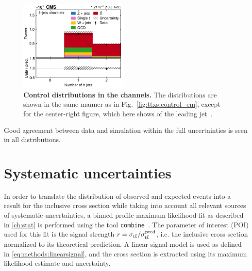 \begin{figure}[!hp]
\hfill
\includegraphics[width=0.49\textwidth]{figures/ttxs/nbtag_lj.pdf}
\caption{
   \textbf{Control distributions in the \ljets channels.} The distributions are shown in the same manner as in Fig.~\ref{fig:ttxs:control_em}, except for the center-right figure, which here shows \abseta of the leading jet~\cite{CMS:TOP-22-012}.
}
\label{fig:ttxs:control_ljets}
\end{figure}

Good agreement between data and simulation within the full uncertainties is seen in all distributions.



\section{Systematic uncertainties}
\label{sec:ttxs:systematics}


In order to translate the distribution of observed and expected events into a result for the inclusive \ttbar cross section while taking into account all relevant sources of systematic uncertainties, a binned profile maximum likelihood fit as described in \cref{ch:stat} is performed using the tool \texttt{combine}~\cite{CMS:CAT-23-001}.
The parameter of interest (POI) used for this fit is the signal strength $r = \sigma_{\mathrm{t \bar{t}}} / \sigma_{\mathrm{t \bar{t}}}^{\text{pred}}$, i.e. the inclusive \ttbar cross section normalized to its theoretical prediction. A linear signal model is used as defined in \cref{eq:methods:linearsignal}, and the \ttbar cross section is extracted using its maximum likelihood estimate and uncertainty.

